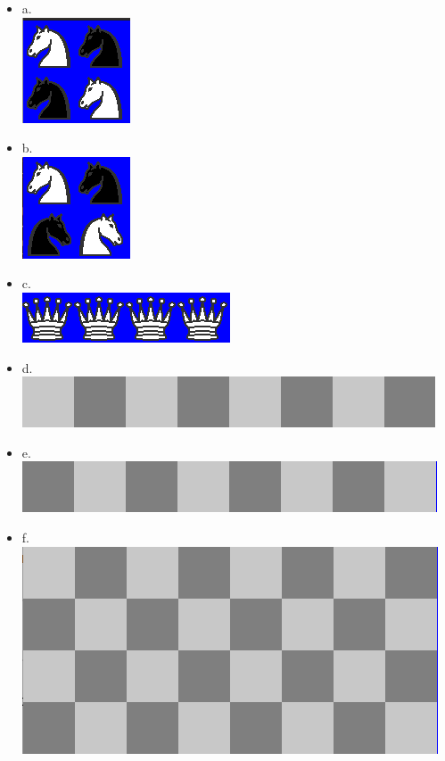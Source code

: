 \documentclass{article}
\begin{document}
\begin{itemize}
    \item a.\\ \includegraphics{img/ejercicio_02_a.png} 
    \item b.\\ \includegraphics{img/ejercicio_02_b.png} 
    \item c.\\ \includegraphics{img/ejercicio_02_c.png}   \item d.\\ \includegraphics{img/ejercicio_02_d.png} 
    \item e.\\ \includegraphics{img/ejercicio_02_e.png} 
    \item f.\\ \includegraphics{img/ejercicio_02_f.png} 

\end{itemize}
\end{document}
